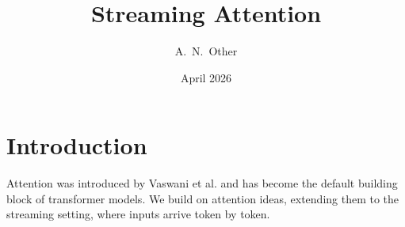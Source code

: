 \documentclass[11pt]{article}
\title{Streaming Attention}
\author{A.\ N.\ Other}
\date{April 2026}
\begin{document}
\maketitle

\section{Introduction}

Attention was introduced by Vaswani et al. and has become the default building block of transformer models.
We build on attention ideas, extending them to the streaming setting, where inputs arrive token by token.
\end{document}

